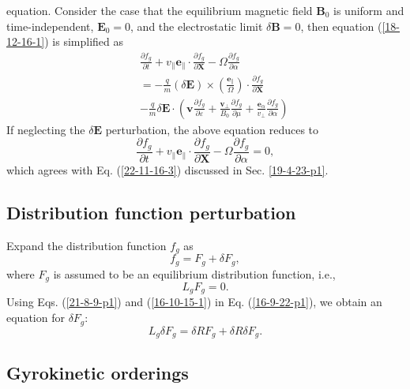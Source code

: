 \documentclass{article}
\newcommand{\tmmathbf}[1]{\ensuremath{\boldsymbol{#1}}}
\begin{document}
equation. Consider the case that the equilibrium magnetic field $\mathbf{B}_0$
is uniform and time-independent, $\mathbf{E}_0 = 0$, and the electrostatic
limit $\delta \mathbf{B}= 0$, then equation (\ref{18-12-16-1}) is simplified
as
\begin{eqnarray}
  &  & \frac{\partial f_g}{\partial t} + v_{\parallel} \mathbf{e}_{\parallel}
  \cdot \frac{\partial f_g}{\partial \mathbf{X}} - \Omega \frac{\partial
  f_g}{\partial \alpha} \nonumber\\
  &  & = - \frac{q}{m} (\delta \mathbf{E}) \times \left(
  \frac{\tmmathbf{e}_{\parallel}}{\Omega}  \right) \cdot \frac{\partial
  f_g}{\partial \mathbf{X}} \\
  &  & - \frac{q}{m} \delta \mathbf{E} \cdot \left( \mathbf{v} \frac{\partial
  f_g}{\partial \varepsilon} + \frac{\mathbf{v}_{\perp}}{B_0}  \frac{\partial
  f_g}{\partial \mu} + \frac{\tmmathbf{e}_{\alpha}}{v_{\perp}}  \frac{\partial
  f_g}{\partial \alpha} \right) 
\end{eqnarray}
If neglecting the $\delta \mathbf{E}$ perturbation, the above equation reduces
to
\begin{equation}
  \frac{\partial f_g}{\partial t} + v_{\parallel} \mathbf{e}_{\parallel} \cdot
  \frac{\partial f_g}{\partial \mathbf{X}} - \Omega \frac{\partial
  f_g}{\partial \alpha} = 0,
\end{equation}
which agrees with Eq. (\ref{22-11-16-3}) discussed in Sec. \ref{19-4-23-p1}.

\subsection{Distribution function perturbation}

Expand the distribution function $f_g$ as
\begin{equation}
  \label{21-8-9-p1} f_g = F_g + \delta F_g,
\end{equation}
where $F_g$ is assumed to be an equilibrium distribution function, i.e.,
\begin{equation}
  \label{16-10-15-1} L_g F_g = 0.
\end{equation}
Using Eqs. (\ref{21-8-9-p1}) and (\ref{16-10-15-1}) in Eq. (\ref{16-9-22-p1}),
we obtain an equation for $\delta F_g$:
\begin{equation}
  \label{16-9-23-p1} L_g \delta F_g = \delta R F_g + \delta R \delta F_g .
\end{equation}

\subsection{Gyrokinetic orderings}
\end{document}

